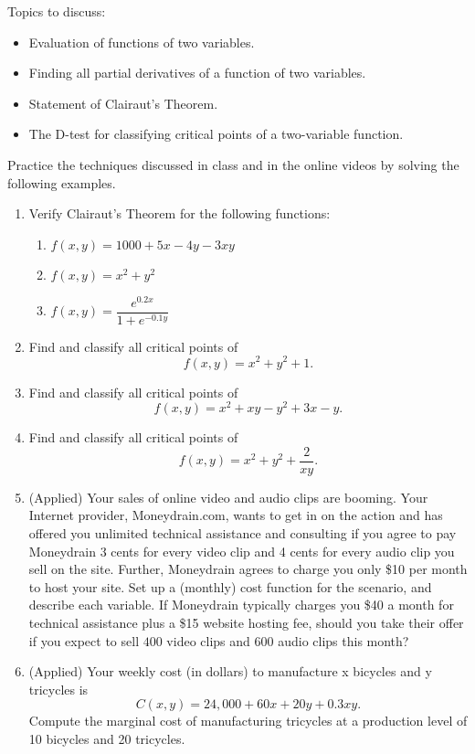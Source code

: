 \documentclass[10pt]{book}
\theoremstyle{definition}
\theoremstyle{remark}
\begin{document}
\begin{large}
\noindent
Topics to discuss:
\begin{itemize}
\item Evaluation of functions of two variables. 
\item Finding all partial derivatives of a function of two variables. 
\item Statement of Clairaut's Theorem.
\item The D-test for classifying critical points of a two-variable function.
\end{itemize}
\newpage

\noindent
Practice the techniques discussed in class and in the online videos by solving the following examples. 
\begin{enumerate}
\item Verify Clairaut's Theorem for the following functions:
\begin{enumerate}
	\item  $f(x,y) = 1000 + 5x -4y -3xy$ \vfill
	\item  $f(x,y) =x^2 + y^2$ \vfill
	\item  $f(x,y) = \dfrac{e^{0.2x}}{1 + e^{-0.1y}}$ \vfill
\end{enumerate} 
\newpage

\item Find and classify all critical points of \[f(x,y) = x^2 + y^2 + 1.\]\vfil\vfil
\item Find and classify all critical points of \[f(x,y) = x^2 + xy - y^2 + 3x - y.\]\vfil\vfil
\item Find and classify all critical points of \[f(x,y) = x^2 + y^2 + \dfrac{2}{xy}.\]  \vfil          
\newpage

\item (Applied) Your sales of online video and audio clips are booming. Your Internet provider, Moneydrain.com, wants to get in on the action and has offered you unlimited technical assistance and consulting if you agree to pay Moneydrain 3 cents for every video clip and 4 cents for every audio clip you sell on the site. Further, Moneydrain agrees to charge you only \$10 per month to host your site. Set up a (monthly) cost function for the scenario, and describe each variable. If Moneydrain typically charges you \$40 a month for technical assistance plus a \$15 website hosting fee, should you take their offer if you expect to sell $400$ video clips and $600$ audio clips this month?\vfil\vfil 
\item (Applied) Your weekly cost (in dollars) to manufacture x bicycles and y tricycles is \[C(x, y) = 24,000 + 60x + 20y + 0.3xy.\]  Compute the marginal cost of manufacturing tricycles at a production level of 10 bicycles and 20 tricycles.\vfil
\end{enumerate}
\end{large}
\newpage
\end{document}
